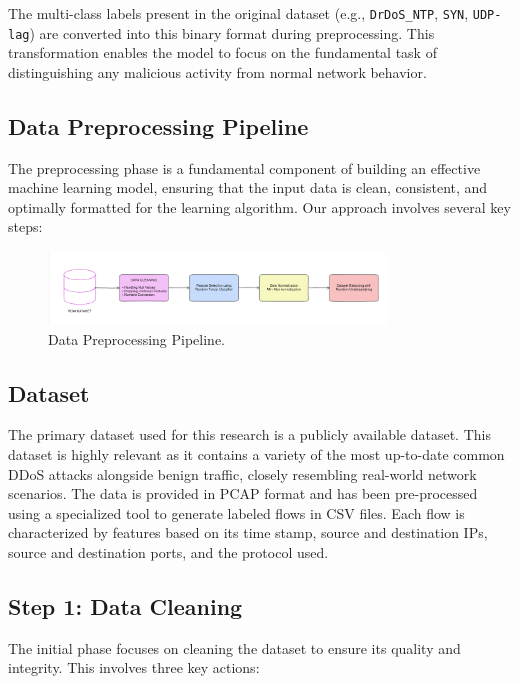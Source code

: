 \documentclass[12pt]{report}
\begin{document}
The multi-class labels present in the original dataset (e.g., \texttt{DrDoS\_NTP}, \texttt{SYN}, \texttt{UDP-lag}) are converted into this binary format during preprocessing. This transformation enables the model to focus on the fundamental task of distinguishing any malicious activity from normal network behavior.


\subsection{Data Preprocessing Pipeline}

The preprocessing phase is a fundamental component of building an effective machine learning model, ensuring that the input data is clean, consistent, and optimally formatted for the learning algorithm. Our approach involves several key steps:

\begin{figure}[htbp]
    \centering
    \includegraphics[width=0.8\textwidth]{images/dataset-preprocessing.png}
    \caption{Data Preprocessing Pipeline.}
    \label{fig:dataset-preprocessing}
\end{figure}


\subsection{Dataset}

The primary dataset used for this research is a publicly available dataset. This dataset is highly relevant as it contains a variety of the most up-to-date common DDoS attacks alongside benign traffic, closely resembling real-world network scenarios. The data is provided in PCAP format and has been pre-processed using a specialized tool to generate labeled flows in CSV files. Each flow is characterized by features based on its time stamp, source and destination IPs, source and destination ports, and the protocol used.

\subsection{Step 1: Data Cleaning}
The initial phase focuses on cleaning the dataset to ensure its quality and integrity. This involves three key actions:
\end{document}
